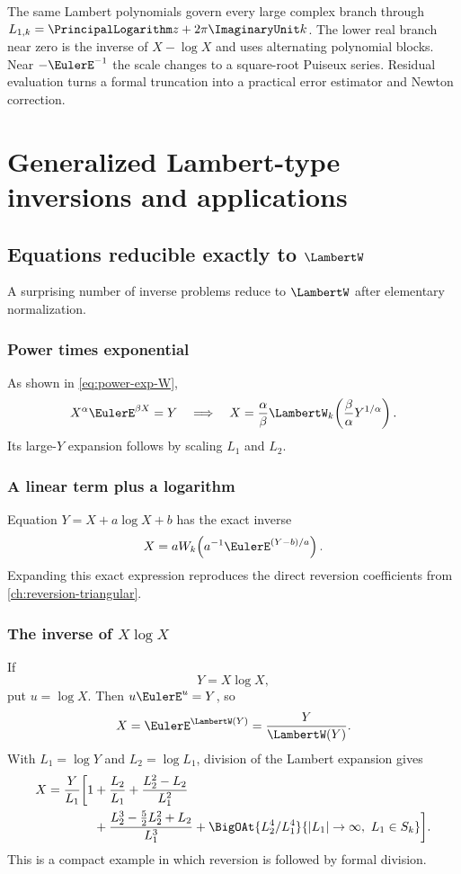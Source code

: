 \documentclass[11pt,oneside]{book}
\theoremstyle{definition}
\theoremstyle{remark}
\begin{document}
\begin{summarybox}
The same Lambert polynomials govern every large complex branch through
$L_{1,k}=\PrincipalLogarithm z+2\pi\ImaginaryUnit k$.  The lower real branch near zero is the inverse of
$X-\log X$ and uses alternating polynomial blocks.  Near $-\EulerE^{-1}$ the scale
changes to a square-root Puiseux series.  Residual evaluation turns a formal
truncation into a practical error estimator and Newton correction.
\end{summarybox}


\chapter{Generalized Lambert-type inversions and applications}
\label{ch:lambert-applications}

\section{Equations reducible exactly to \texorpdfstring{$\LambertW$}{W}}
A surprising number of inverse problems reduce to $\LambertW$ after elementary
normalization.

\subsection{Power times exponential}
As shown in \eqref{eq:power-exp-W},
\[
 X^\alpha\EulerE^{\beta X}=Y
 \quad\Longrightarrow\quad
 X=\frac{\alpha}{\beta}
 \LambertW_k\!\left(\frac{\beta}{\alpha}Y^{1/\alpha}\right).
\]
Its large-$Y$ expansion follows by scaling $L_1$ and $L_2$.

\subsection{A linear term plus a logarithm}
Equation $Y=X+a\log X+b$ has the exact inverse
\[
 X=aW_k\!\left(a^{-1}\EulerE^{(Y-b)/a}\right).
\]
Expanding this exact expression reproduces the direct reversion coefficients
from \cref{ch:reversion-triangular}.

\subsection{The inverse of \texorpdfstring{$X\log X$}{X log X}}
If
\[
 Y=X\log X,
\]
put $u=\log X$.  Then $u\EulerE^u=Y$, so
\begin{equation}\label{eq:XlogX-inverse}
 X=\EulerE^{\LambertW(Y)}=\frac{Y}{\LambertW(Y)}.
\end{equation}
With $L_1=\log Y$ and $L_2=\log L_1$, division of the Lambert expansion gives
\begin{align}\label{eq:XlogX-asymptotic}
 X=\frac{Y}{L_1}\biggl[1
 &+\frac{L_2}{L_1}
 +\frac{L_2^2-L_2}{L_1^2}\\
 &+\frac{L_2^3-\frac52L_2^2+L_2}{L_1^3}
 +\BigOAt{L_2^4/L_1^4}{|L_1|\to\infty,\ L_1\in S_k}\biggr].\notag
\end{align}
This is a compact example in which reversion is followed by formal division.
\end{document}
